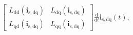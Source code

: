 \begin{frame}
\begin{equation}
\begin{split}
{\begin{bmatrix}
                                                                                                                                                                                                           L_\mathrm{dd}(\bm{i}_\mathrm{s,dq}) & L_\mathrm{dq}(\bm{i}_\mathrm{s,dq}) \\[1.6ex]
                                                                                                                                                                                                           L_\mathrm{qd}(\bm{i}_\mathrm{s,dq}) & L_\mathrm{qq}(\bm{i}_\mathrm{s,dq})
                                                                                                                                                                                                       \end{bmatrix}\frac{\mathrm{d}}{\mathrm{d}t}\bm{i}_\mathrm{s,dq}(t),}
        \end{split}
    \end{equation}
\end{frame}

